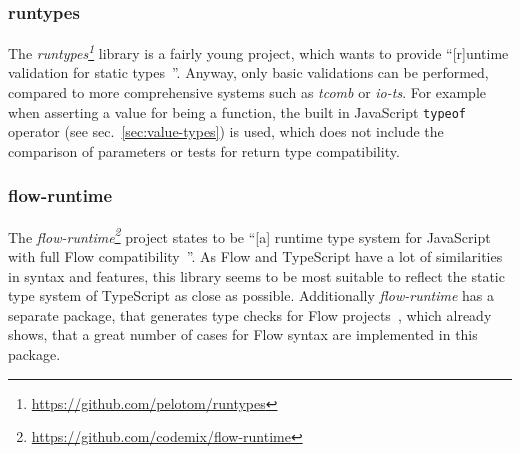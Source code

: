 \subsubsection{runtypes}

The \emph{runtypes\footnote{\url{https://github.com/pelotom/runtypes}}} library is a fairly young project, which wants to provide ``[r]untime validation for static types~\cite{RuntimeTypeSystem:runtypes}''. Anyway, only basic validations can be performed, compared to more comprehensive systems such as \emph{tcomb} or \emph{io-ts}. For example when asserting a value for being a function, the built in JavaScript \texttt{typeof} operator (see sec.~\ref{sec:value-types}) is used, which does not include the comparison of parameters or tests for return type compatibility.

\subsubsection{flow-runtime}

The \emph{flow-runtime\footnote{\url{https://github.com/codemix/flow-runtime}}} project states to be ``[a] runtime type system for JavaScript with full Flow compatibility~\cite{RuntimeTypeSystem:flow-runtime:lib}''. As Flow and TypeScript have a lot of similarities in syntax and features, this library seems to be most suitable to reflect the static type system of TypeScript as close as possible. Additionally \emph{flow-runtime} has a separate package, that generates type checks for Flow projects~\cite{RuntimeTypeSystem:flow-runtime:babel}, which already shows, that a great number of cases for Flow syntax are implemented in this package.





